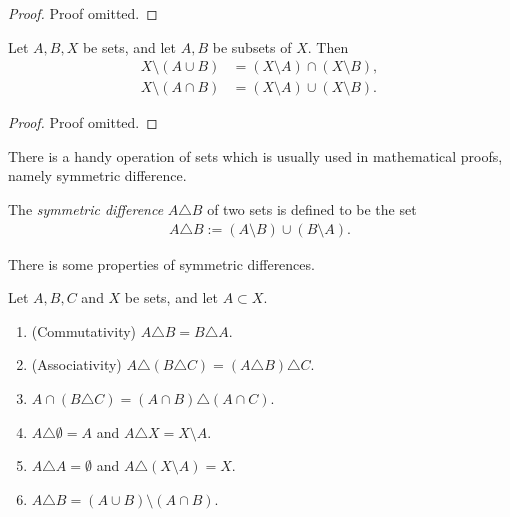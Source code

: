 \begin{proof}
    Proof omitted.
\end{proof}

\begin{proposition}
    Let $A, B, X$ be sets, and let $A, B$ be subsets of $X$. Then
    \begin{align*}
        X \setminus (A \cup B) &= (X \setminus A) \cap (X \setminus B),\\
        X \setminus (A \cap B) &= (X \setminus A) \cup (X \setminus B).
    \end{align*}
\end{proposition}

\begin{proof}
    Proof omitted.
\end{proof}

There is a handy operation of sets which is usually used in mathematical proofs, namely symmetric difference.

\begin{definition}
    The \emph{symmetric difference} $A \triangle B$ of two sets is defined to be the set
    \begin{align*}
        A \triangle B := (A \setminus B) \cup (B \setminus A).
    \end{align*}
\end{definition}

There is some properties of symmetric differences.

\begin{proposition}
    Let $A, B, C$ and $X$ be sets, and let $A \subset X$.
    \begin{enumerate}
        \item (Commutativity) $A \triangle B = B \triangle A$.
        \item (Associativity) $A \triangle (B \triangle C) = (A \triangle B) \triangle C$.
        \item $A \cap (B \triangle C) = (A \cap B) \triangle (A \cap C)$.
        \item $A \triangle \emptyset = A$ and $A \triangle X = X \setminus A$.
        \item $A \triangle A = \emptyset$ and $A \triangle (X \setminus A) = X$.
        \item $A \triangle B = (A \cup B) \setminus (A \cap B)$.
    \end{enumerate}
\end{proposition}


